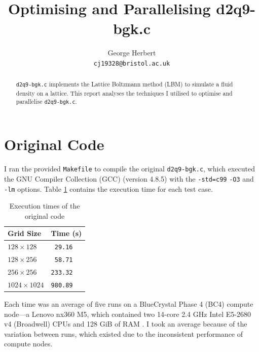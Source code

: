 \documentclass[twocolumn, a4paper]{article}
\author{
  George Herbert\\
  \texttt{cj19328@bristol.ac.uk}
}
\title{\vspace{-2em}Optimising and Parallelising d2q9-bgk.c}
\begin{document}
\maketitle

\begin{abstract}
    \texttt{d2q9-bgk.c} implements the Lattice Boltzmann method (LBM) to simulate a fluid density on a lattice.
    This report analyses the techniques I utilised to optimise and parallelise \texttt{d2q9-bgk.c}.
\end{abstract}

\section{Original Code}

I ran the provided \texttt{Makefile} to compile the original \texttt{d2q9-bgk.c}, which executed the GNU Compiler Collection (GCC) (version 4.8.5) with the \texttt{-std=c99} \texttt{-O3} and \texttt{-lm} options.
Table \ref{tab:original} contains the execution time for each test case.

\begin{table}[htbp]
  \begin{center}
  \caption{Execution times of the original code}\label{tab:original}
  \begin{tabular}[t]{l | l} 
      \hline\hline
      Grid Size&Time (s)\\
      \hline
      $128 \times 128$&\texttt{ 29.16}\\
      $128 \times 256$&\texttt{ 58.71}\\
      $256 \times 256$&\texttt{233.32}\\
      $1024 \times 1024$&\texttt{980.89}\\
      \hline
    \end{tabular}
  \end{center}
  \vspace{-1em}
\end{table} 

Each time was an average of five runs on a BlueCrystal Phase 4 (BC4) compute node---a Lenovo nx360 M5, which contained two 14-core 2.4 GHz Intel E5-2680 v4 (Broadwell) CPUs and 128 GiB of RAM \cite{bcp4}.
I took an average because of the variation between runs, which existed due to the inconsistent performance of compute nodes.
\end{document}
